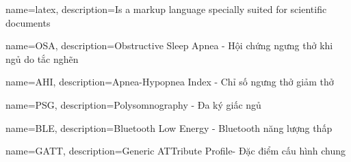 {
    name=latex,
    description={Is a markup language specially suited 
    for scientific documents}
}



{
    name=OSA,
    description={Obstructive Sleep Apnea - Hội chứng ngưng thở khi ngủ do tắc nghẽn}
}

{
    name=AHI,
    description={Apnea-Hypopnea Index - Chỉ số ngưng thở giảm thở }
}

{
    name=PSG,
    description={Polysomnography - Đa ký giấc ngủ }
}

{
    name=BLE,
    description={Bluetooth Low Energy - Bluetooth năng lượng thấp }
}

{
    name=GATT,
    description={Generic ATTribute Profile- Đặc điểm cấu hình chung }
}



